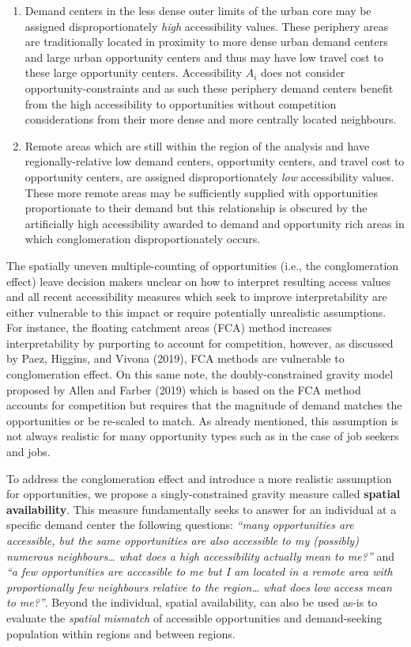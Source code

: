 \documentclass[]{elsarticle} %
\begin{document}
\begin{enumerate}
\def\labelenumi{\arabic{enumi})}
\item
  Demand centers in the less dense outer limits of the urban core may be
  assigned disproportionately \emph{high} accessibility values. These
  periphery areas are traditionally located in proximity to more dense
  urban demand centers and large urban opportunity centers and thus may
  have low travel cost to these large opportunity centers. Accessibility
  \(A_i\) does not consider opportunity-constraints and as such these
  periphery demand centers benefit from the high accessibility to
  opportunities without competition considerations from their more dense
  and more centrally located neighbours.
\item
  Remote areas which are still within the region of the analysis and
  have regionally-relative low demand centers, opportunity centers, and
  travel cost to opportunity centers, are assigned disproportionately
  \emph{low} accessibility values. These more remote areas may be
  sufficiently supplied with opportunities proportionate to their demand
  but this relationship is obscured by the artificially high
  accessibility awarded to demand and opportunity rich areas in which
  conglomeration disproportionately occurs.
\end{enumerate}

The spatially uneven multiple-counting of opportunities (i.e., the
conglomeration effect) leave decision makers unclear on how to interpret
resulting access values and all recent accessibility measures which seek
to improve interpretability are either vulnerable to this impact or
require potentially unrealistic assumptions. For instance, the floating
catchment areas (FCA) method increases interpretability by purporting to
account for competition, however, as discussed by Paez, Higgins, and
Vivona (2019), FCA methods are vulnerable to conglomeration effect. On
this same note, the doubly-constrained gravity model proposed by Allen
and Farber (2019) which is based on the FCA method accounts for
competition but requires that the magnitude of demand matches the
opportunities or be re-scaled to match. As already mentioned, this
assumption is not always realistic for many opportunity types such as in
the case of job seekers and jobs.

To address the conglomeration effect and introduce a more realistic
assumption for opportunities, we propose a singly-constrained gravity
measure called \textbf{spatial availability}. This measure fundamentally
seeks to answer for an individual at a specific demand center the
following questions: \emph{``many opportunities are accessible, but the
same opportunities are also accessible to my (possibly) numerous
neighbours\ldots{} what does a high accessibility actually mean to
me?''} and \emph{``a few opportunities are accessible to me but I am
located in a remote area with proportionally few neighbours relative to
the region\ldots{} what does low access mean to me?''}. Beyond the
individual, spatial availability, can also be used as-is to evaluate the
\emph{spatial mismatch} of accessible opportunities and demand-seeking
population within regions and between regions.
\end{document}
